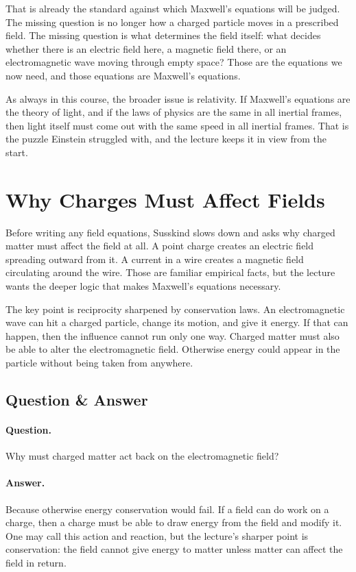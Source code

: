 That is already the standard against which Maxwell's equations will be judged. The missing question is no longer how a charged particle moves in a prescribed field. The missing question is what determines the field itself: what decides whether there is an electric field here, a magnetic field there, or an electromagnetic wave moving through empty space? Those are the equations we now need, and those equations are Maxwell's equations.

As always in this course, the broader issue is relativity. If Maxwell's equations are the theory of light, and if the laws of physics are the same in all inertial frames, then light itself must come out with the same speed in all inertial frames. That is the puzzle Einstein struggled with, and the lecture keeps it in view from the start.

\section{Why Charges Must Affect Fields}

Before writing any field equations, Susskind slows down and asks why charged matter must affect the field at all. A point charge creates an electric field spreading outward from it. A current in a wire creates a magnetic field circulating around the wire. Those are familiar empirical facts, but the lecture wants the deeper logic that makes Maxwell's equations necessary.

The key point is reciprocity sharpened by conservation laws. An electromagnetic wave can hit a charged particle, change its motion, and give it energy. If that can happen, then the influence cannot run only one way. Charged matter must also be able to alter the electromagnetic field. Otherwise energy could appear in the particle without being taken from anywhere.

\subsection{Question \& Answer}

\paragraph{Question.} Why must charged matter act back on the electromagnetic field?

\paragraph{Answer.} Because otherwise energy conservation would fail. If a field can do work on a charge, then a charge must be able to draw energy from the field and modify it. One may call this action and reaction, but the lecture's sharper point is conservation: the field cannot give energy to matter unless matter can affect the field in return.

